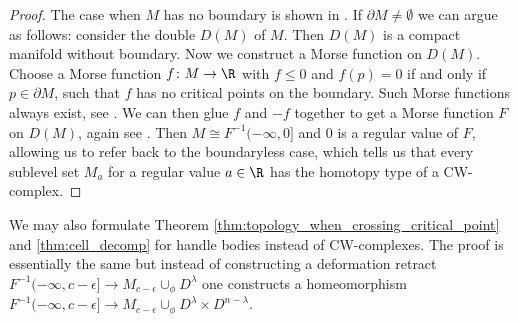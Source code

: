     \begin{proof}
        The case when $M$ has no boundary is shown in \cite{milnor1963morse}. If $\partial M \neq \emptyset$ we can argue as follows: consider the double $D(M)$ of $M$. Then $D(M)$ is a compact manifold without boundary. Now we construct a Morse function on $D(M)$. Choose a Morse function $f \colon M \to \R$ with $f \leq 0$ and $f(p) = 0$ if and only if $p \in \partial M$, such that $f$ has no critical points on the boundary. Such Morse functions always exist, see \cite{BA}. We can then glue $f$ and $-f$ together to get a Morse function $F$ on $D(M)$, again see \cite{BA}. Then $M \cong F^{-1}(-\infty,0]$ and $0$ is a regular value of $F$, allowing us to refer back to the boundaryless case, which tells us that every sublevel set $M_a$ for a regular value $a \in \R$ has the homotopy type of a CW-complex.
    \end{proof}

    \begin{remark}
        We may also formulate Theorem \ref{thm:topology_when_crossing_critical_point} and \ref{thm:cell_decomp} for handle bodies instead of CW-complexes. The proof is essentially the same but instead of constructing a deformation retract $F^{-1}(-\infty,c-\epsilon] \to M_{c-\epsilon} \cup_\phi D^\lambda$ one constructs a homeomorphism $F^{-1}(-\infty,c-\epsilon] \to M_{c-\epsilon} \cup_\phi D^\lambda \times D^{n-\lambda}$.
    \end{remark}
